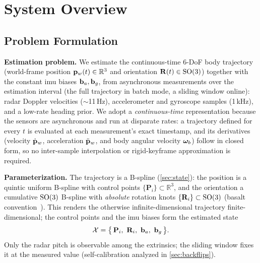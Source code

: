 \section{System Overview}
\label{sec:overview}

\subsection{Problem Formulation}
\label{sec:problem}

\textbf{Estimation problem.}
We estimate the continuous-time 6-DoF body trajectory (world-frame
position $\mathbf{p}_w(t)\in\mathbb{R}^3$ and orientation $\mathbf{R}(t)\in\mathrm{SO}(3)$)
together with the constant \ac{imu} biases $\mathbf{b}_a,\mathbf{b}_g$, from asynchronous
measurements over the estimation interval (the full trajectory in batch
mode, a sliding window online): radar Doppler velocities ($\sim$11\,Hz),
accelerometer and gyroscope samples (1\,kHz), and a low-rate heading
prior.  We adopt a \emph{continuous-time} representation because the
sensors are asynchronous and run at disparate rates: a trajectory defined
for every $t$ is evaluated at each measurement's exact timestamp, and its
derivatives (velocity $\dot{\mathbf{p}}_w$, acceleration $\ddot{\mathbf{p}}_w$, and
body angular velocity $\boldsymbol{\omega}_b$) follow in closed form, so no
inter-sample interpolation or rigid-keyframe approximation is required.

\textbf{Parameterization.}
The trajectory is a B-spline (\autoref{sec:state}): the position is a
quintic uniform B-spline with control points
$\{\mathbf{P}_i\}\subset\mathbb{R}^3$, and the orientation a cumulative
$\mathrm{SO}(3)$ B-spline with \emph{absolute} rotation knots
$\{\mathbf{R}_i\}\subset\mathrm{SO}(3)$ (basalt convention~\cite{usenko2020basalt}).
This renders the otherwise infinite-dimensional trajectory
finite-dimensional; the control points and the \ac{imu} biases form the
estimated state
\begin{equation}
  \mathcal{X} = \bigl\{\,\mathbf{P}_i,\ \vR_i,\ \vb_a,\ \vb_g\,\bigr\}.
  \label{eq:state}
\end{equation}
Only the radar pitch is observable among the extrinsics; the
sliding window fixes it at the measured value (self-calibration analyzed in
\autoref{sec:backflips}).

